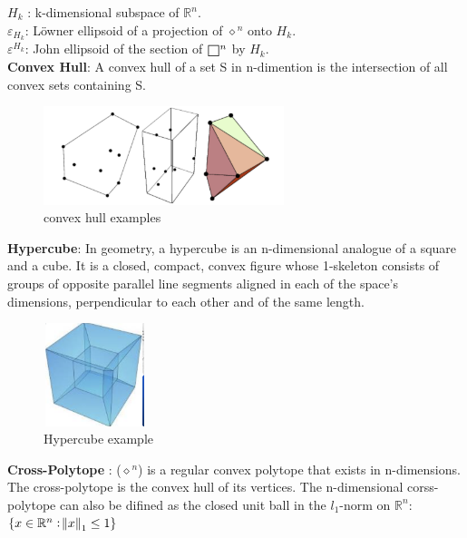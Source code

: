 \documentclass[fontsize=12pt,a4paper]{article}
\def\msquare{\mathord{\scalerel*{\Box}{gX}}}
\begin{document}
\textbf{$H_k$} : k-dimensional subspace of $\mathbb{R}^n$.\\

\textbf{$\varepsilon_{H_k}$}: Löwner ellipsoid of a projection of $\diamond{}^n$ onto $H_k$.\\

\textbf{$\varepsilon^{H_k}$}: John ellipsoid of the section of $\msquare{}^n$ by $H_k$.\\

\textbf{Convex Hull}: A convex hull of a set S in n-dimention is the intersection of all convex sets containing S.\\

\begin{figure}[!htb]
\centering
  \includegraphics[width=7cm,]{convex-h.png}
  \caption{convex hull examples}
\end{figure}


\textbf{Hypercube}: In geometry, a hypercube is an n-dimensional analogue of a square and a cube. It is a closed, compact, convex figure whose 1-skeleton consists of groups of opposite parallel line segments aligned in each of the space's dimensions, perpendicular to each other and of the same length.\\

\begin{figure}[!htb]
\centering
  \includegraphics[width=3cm,height = 3cm]{hypercube.png}
  \caption{Hypercube example}
\end{figure}



\textbf{Cross-Polytope} : ($\diamond{}^n$) is a regular convex polytope that exists in n-dimensions. The cross-polytope is the convex hull of its vertices. The n-dimensional corss-polytope can also be difined as the closed unit ball in the $l_1$-norm on $\mathbb{R}^n$:\\
$\{x \in \mathbb{R}^n : \norm{x}_1 \leq 1\}$\\
\end{document}
